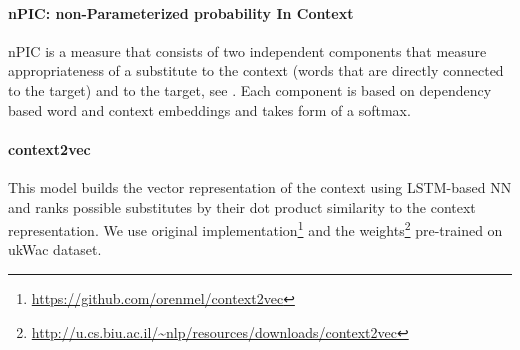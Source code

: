 \documentclass[11pt,a4paper]{article}
\begin{document}
\paragraph{nPIC: non-Parameterized probability In Context}

nPIC is a measure that consists of two independent components that measure appropriateness of a substitute to the context (words that are directly connected to the target) and to the target, see \cite{pic}. Each component is based on dependency based word and context embeddings and takes form of a softmax.

\paragraph{context2vec}

This model builds the vector representation of the context using LSTM-based NN and ranks possible substitutes by their dot product similarity to the context representation. We use original implementation\footnote{\url{https://github.com/orenmel/context2vec}} and the weights\footnote{\url{http://u.cs.biu.ac.il/~nlp/resources/downloads/context2vec}} pre-trained on ukWac dataset.



\end{document}
